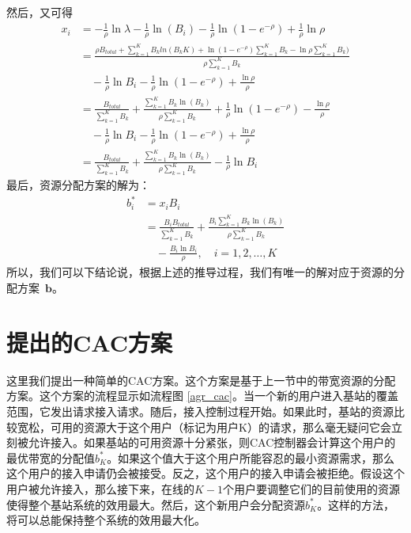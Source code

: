 然后，又可得
\begin{equation}
\begin{split}
x_i &=-\frac{1}{\rho} \ln \lambda- \frac{1}{\rho} \ln (B_i) -
\frac{1}{\rho} \ln (1-e^{-\rho}) + \frac{1}{\rho} \ln \rho
\\
&= \frac{\rho B_{total} + \sum^K_{k=1}B_k ln (B_kK) + \ln(1 -
e^{-\rho} )\sum^K_{k=1}B_k - \ln \rho \sum^K_{k=1}
B_k)}{\rho \sum^K_{k=1}B_k} \\&\quad - \frac{1}{\rho} \ln B_i
-\frac{1}{\rho} \ln(1-e^{-\rho}) + \frac{\ln \rho}{\rho}
\\
&= \frac{B_{total}}{\sum^K_{k=1}B_k} + \frac{\sum^K_{k=1}B_k
\ln (B_k)}{\rho \sum^K_{k=1}B_k} + \frac{1}{\rho}
\ln(1-e^{-\rho}) - \frac{\ln \rho}{\rho} \\
& \quad - \frac{1}{\rho} \ln B_i -\frac{1}{\rho}
\ln(1-e^{-\rho}) + \frac{\ln \rho}{\rho} \\
& = \frac{B_{total}}{\sum^K_{k=1}B_k} +\frac{\sum^K_{k=1}B_k \ln
(B_k)}{\rho \sum^K_{k=1}B_k} - \frac{1}{\rho} \ln B_i
\end{split}
\end{equation}
最后，资源分配方案的解为：
\begin{equation}
\begin{split}
b_i^* &= x_i B_i \\
&= \frac{B_i B_{total}}{\sum^K_{k=1}B_k} +\frac{B_i \sum^K_{k=1}B_k
\ln (B_k)}{\rho \sum^K_{k=1}B_k} \\&\quad - \frac{B_i \ln
B_i}{\rho}, \quad i=1,2,\dots,K
\end{split}
\label{eqn:b_i_bw}
\end{equation}
所以，我们可以下结论说，根据上述的推导过程，我们有唯一的解对应于资源的分配方案~$\mathbf{b}$。

\section{提出的CAC方案}
\label{sec_cacop_alg}
这里我们提出一种简单的CAC方案。这个方案是基于上一节中的带宽资源的分配方案。这个方案的流程显示如流程图 \ref{agr_cac}。当一个新的用户进入基站的覆盖范围，它发出请求接入请求。随后，接入控制过程开始。如果此时，基站的资源比较宽松，可用的资源大于这个用户（标记为用户K）的请求，那么毫无疑问它会立刻被允许接入。如果基站的可用资源十分紧张，则CAC控制器会计算这个用户的最优带宽的分配值$b_K^*$。如果这个值大于这个用户所能容忍的最小资源需求，那么这个用户的接入申请仍会被接受。反之，这个用户的接入申请会被拒绝。假设这个用户被允许接入，那么接下来，在线的$K-1$个用户要调整它们的目前使用的资源使得整个基站系统的效用最大。然后，这个新用户会分配资源$b_K^*$。这样的方法，将可以总能保持整个系统的效用最大化。

